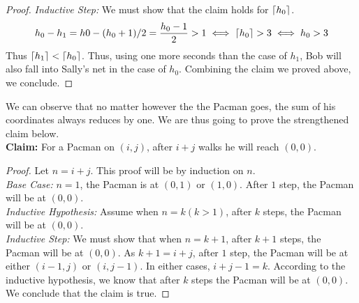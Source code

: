 \documentclass[11pt]{article}
\begin{document}
\begin{Answer}
\begin{proof}
            \emph{Inductive Step:} We must show that the claim holds for $\lceil h_0\rceil$. 
            \begin{align*}
                h_0-h_1=h0-(h_0+1)/2=\frac{h_0-1}{2}>1\iff \lceil h_0\rceil>3 \iff h_0>3
            \end{align*}
            Thus $\lceil h_1\rceil<\lceil h_0\rceil$. Thus, using one more seconds than the case of $h_1$, Bob will also fall into
            Sally's net in the case of $h_0$. Combining the claim we proved above, we conclude. 
        \end{proof}
    \end{Answer}

    \newpage

    \begin{Answer}
        We can observe that no matter however the the Pacman goes, the sum of his coordinates always reduces by one. 
        We are thus going to prove the strengthened claim below. \\
        \textbf{Claim:} For a Pacman on $(i,j)$, after $i+j$ walks he will reach $(0,0)$.
        \begin{proof}
            Let $n=i+j$. This proof will be by induction on $n$. \\
            \emph{Base Case:} $n=1$, the Pacman is at $(0,1)$ or $(1,0)$. After $1$ step, the Pacman will be at $(0,0)$. \\
            \emph{Inductive Hypothesis:} Assume when $n=k(k>1)$, after $k$ steps, the Pacman will be at $(0,0)$. \\
            \emph{Inductive Step:} We must show that when $n=k+1$, after $k+1$ steps, the Pacman will be at $(0,0)$. 
            As $k+1=i+j$, after $1$ step, the Pacman will be at either $(i-1,j)$ or $(i,j-1)$. In either cases, $i+j-1=k$.
            According to the inductive hypothesis, we know that after $k$ steps the Pacman will be at $(0,0)$. \\ 
            We conclude that the claim is true. 
        \end{proof}
    \end{Answer}

    \newpage
\end{document}
